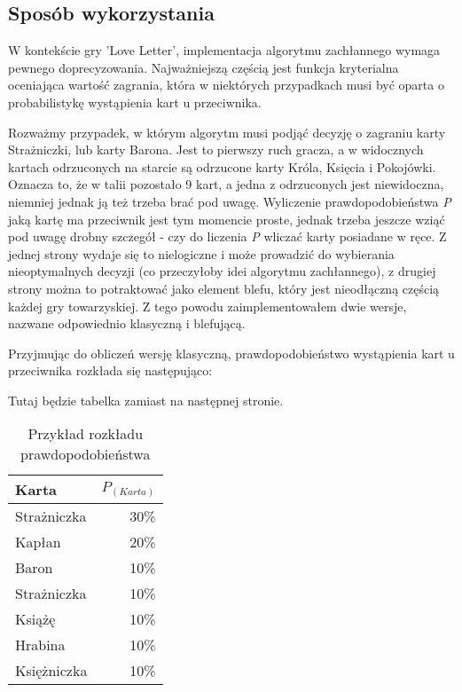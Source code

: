 \subsection{Sposób wykorzystania}

W kontekście gry 'Love Letter', implementacja algorytmu zachłannego wymaga pewnego doprecyzowania. Najważniejszą częścią jest funkcja kryterialna oceniająca wartość zagrania, która w niektórych przypadkach musi być oparta o probabilistykę wystąpienia kart u przeciwnika. 

Rozważmy przypadek, w którym algorytm musi podjąć decyzję o zagraniu karty Strażniczki, lub karty Barona. Jest to pierwszy ruch gracza, a w widocznych kartach odrzuconych na starcie są odrzucone karty Króla, Księcia i Pokojówki. Oznacza to, że w talii pozostało 9 kart, a jedna z odrzuconych jest niewidoczna, niemniej jednak ją też trzeba brać pod uwagę. Wyliczenie prawdopodobieństwa \textit{P} jaką kartę ma przeciwnik jest tym momencie proste, jednak trzeba jeszcze wziąć pod uwagę drobny szczegół - czy do liczenia \textit{P} wliczać karty posiadane w ręce. Z jednej strony wydaje się to nielogiczne i może prowadzić do wybierania nieoptymalnych decyzji (co przeczyłoby idei algorytmu zachłannego), z drugiej strony można to potraktować jako element blefu, który jest nieodłączną częścią każdej gry towarzyskiej. Z tego powodu zaimplementowałem dwie wersje, nazwane odpowiednio klasyczną i blefującą.

Przyjmując do obliczeń wersję klasyczną, prawdopodobieństwo wystąpienia kart u przeciwnika rozkłada się następująco:


\begin{center}
	Tutaj będzie tabelka zamiast na następnej stronie. %
\end{center}

\clearpage
\begin{table}[t]
	\caption{Przykład rozkładu prawdopodobieństwa}
	\centering
		\begin{tabular}{|l|r|}
			\hline
			Karta & $P_{(Karta)}$	\\ \hline
			Strażniczka & 30\% 			\\ \hline
			Kapłan & 20\% 				\\ \hline
			Baron & 10\% 				\\ \hline
			Strażniczka & 10\% 			\\ \hline
			Książę & 10\% 				\\ \hline
			Hrabina & 10\% 				\\ \hline
			Księżniczka & 10\% 			\\ \hline
		\end{tabular}
\end{table}

